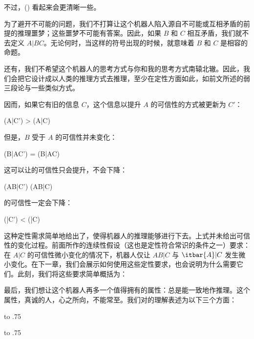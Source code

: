 不过，(\in[1-32]) 看起来会更清晰一些。

为了避开不可能的问题，我们不打算让这个机器人陷入源自不可能或互相矛盾的前提的推理噩梦；这些噩梦不可能有答案。因此，如果 $B$ 和 $C$ 相互矛盾，我们就不去定义 $A|BC$。无论何时，当这样的符号出现的时候，就意味着 $B$ 和 $C$ 是相容的命题。

还有，我们不希望这个机器人的思考方式与你和我的思考方式南辕北辙。因此，我们会把它设计成以人类的推理方式去推理，至少在定性方面如此，如前文所述的弱三段论与一些类似方式。

因而，如果它有旧的信息 $C$，这个信息以提升 $A$ 的可信性的方式被更新为 $C'$：

\placeformula
\startformula
(A|C') > (A|C)
\stopformula

但是，$B$ 受于 $A$ 的可信性并未变化：

\placeformula
\startformula
(B|AC') = (B|AC)
\stopformula

这可以让的可信性只会提升，不会下降：

\placeformula
\startformula
(AB|C') \ge (AB|C)
\stopformula

的可信性一定会下降：

\placeformula
\startformula
(|C') < (|C)
\stopformula

这种定性需求简单地给出了，使得机器人的推理能够进行下去。上式并未给出可信性的变化过程。前面所作的连续性假设（这也是定性符合常识的条件之一）要求：在 $A|C$ 的可信性微小变化的情况下，机器人仅让 $AB|C$ 与 $\itbar{A}|C$ 发生微小变化。在下一章，我们会展示如何使用这些定性要求，也会说明为什么需要它们。此刻，我们将这些要求简单概括为：

\placeformula[desiderata-2]
\startformula
{}\quad{}
\stopformula

最后，我们想让这个机器人再多一个值得拥有的属性：总是能一致地作推理。这个属性，真诚的人，心之所向，不能常至。我们对的理解表述为以下三个方面：


\startsubformulas[desiderata-3a]
\placeformula
\startformula
{}\quad\quad\hbox to .75
\stopformula

\placeformula[desiderata-3b]
\startformula
{}\quad\quad\hbox to .75
\stopformula

